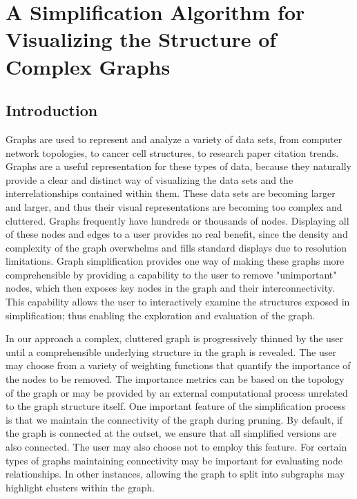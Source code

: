 \chapter{A Simplification Algorithm for Visualizing the Structure of Complex Graphs}
\label{chap:graph_simp}
\section{Introduction} 
Graphs are used to represent and analyze a variety of data sets, from computer network topologies, to cancer cell structures, to research paper citation trends.  Graphs are a useful representation for these types of data, because they naturally provide a clear and distinct way of visualizing the data sets and the interrelationships contained within them.  These data sets are becoming larger and larger, and thus their visual representations are becoming too complex and cluttered.  Graphs frequently have hundreds or thousands of nodes.  Displaying all of these nodes and edges to a user provides no real benefit, since the density and complexity of the graph overwhelms and fills standard displays due to resolution limitations.  Graph simplification provides one way of making these graphs more comprehensible by providing a capability to the user to remove "unimportant" nodes, which then exposes key nodes in the graph and their interconnectivity.  This capability allows the user to interactively examine the structures exposed in simplification; thus enabling the exploration and evaluation of the graph.

In our approach a complex, cluttered graph is progressively thinned by the user until a comprehensible underlying structure in the graph is revealed.  The user may choose from a variety of weighting functions that quantify the importance of the nodes to be removed.  The importance metrics can be based on the topology of the graph or may be provided by an external computational process unrelated to the graph structure itself.  One important feature of the simplification process is that we maintain the connectivity of the graph during pruning.  By default, if the graph is connected at the outset, we ensure that all simplified versions are also connected. The user may also choose not to employ this feature.  For certain types of graphs maintaining connectivity may be important for evaluating node relationships.  In other instances, allowing the graph to split into subgraphs may highlight clusters within the graph.

